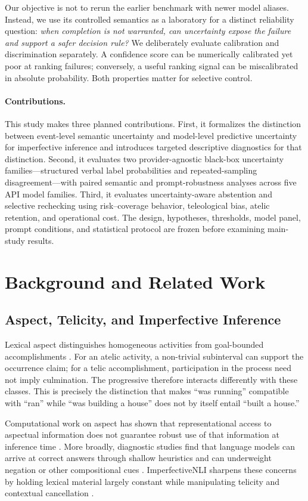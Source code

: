 \documentclass[letterpaper]{article}
\begin{document}
Our objective is not to rerun the earlier benchmark with newer model aliases. Instead, we use its controlled semantics as a laboratory for a distinct reliability question: \emph{when completion is not warranted, can uncertainty expose the failure and support a safer decision rule?} We deliberately evaluate calibration and discrimination separately. A confidence score can be numerically calibrated yet poor at ranking failures; conversely, a useful ranking signal can be miscalibrated in absolute probability. Both properties matter for selective control.

\paragraph{Contributions.} This study makes three planned contributions. First, it formalizes the distinction between event-level semantic uncertainty and model-level predictive uncertainty for imperfective inference and introduces targeted descriptive diagnostics for that distinction. Second, it evaluates two provider-agnostic black-box uncertainty families---structured verbal label probabilities and repeated-sampling disagreement---with paired semantic and prompt-robustness analyses across five API model families. Third, it evaluates uncertainty-aware abstention and selective rechecking using risk--coverage behavior, teleological bias, atelic retention, and operational cost. The design, hypotheses, thresholds, model panel, prompt conditions, and statistical protocol are frozen before examining main-study results.

\section{Background and Related Work}
\subsection{Aspect, Telicity, and Imperfective Inference}
Lexical aspect distinguishes homogeneous activities from goal-bounded accomplishments \citep{vendler-1957-verbs}. For an atelic activity, a non-trivial subinterval can support the occurrence claim; for a telic accomplishment, participation in the process need not imply culmination. The progressive therefore interacts differently with these classes. This is precisely the distinction that makes ``was running'' compatible with ``ran'' while ``was building a house'' does not by itself entail ``built a house.''

Computational work on aspect has shown that representational access to aspectual information does not guarantee robust use of that information at inference time \citep{ma-2024-lexical}. More broadly, diagnostic studies find that language models can arrive at correct answers through shallow heuristics and can underweight negation or other compositional cues \citep{ettinger-2020-bert,kassner-schutze-2020-negated}. ImperfectiveNLI sharpens these concerns by holding lexical material largely constant while manipulating telicity and contextual cancellation \citep{ma-miyao-2026-imperfective}.
\end{document}
